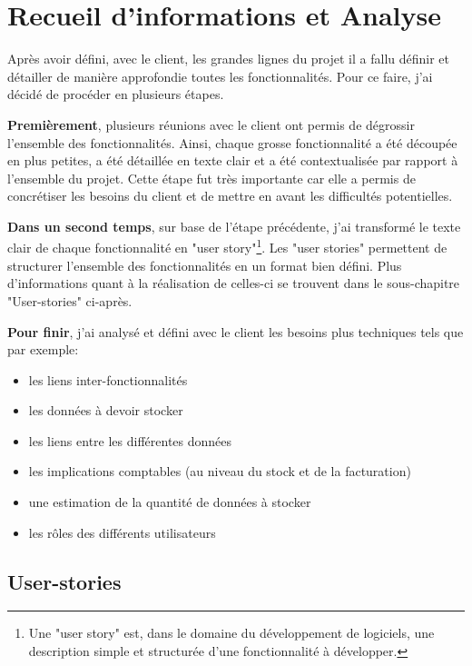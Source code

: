 \section{Recueil d'informations et Analyse}

Après avoir défini, avec le client, les grandes lignes du projet il a fallu définir et détailler de manière approfondie toutes les fonctionnalités. Pour ce faire, j'ai décidé de procéder en plusieurs étapes. 

\newpara

\textbf{Premièrement}, plusieurs réunions avec le client ont permis de dégrossir l'ensemble des fonctionnalités. Ainsi, chaque grosse fonctionnalité a été découpée en plus petites, a été détaillée en texte clair et a été contextualisée par rapport à l'ensemble du projet. 
Cette étape fut très importante car elle a permis de concrétiser les besoins du client et de mettre en avant les difficultés potentielles. 

\newpara

\textbf{Dans un second temps}, sur base de l'étape précédente, j'ai transformé le texte clair de chaque fonctionnalité en "user story"\footnote{Une "user story" est, dans le domaine du développement de logiciels, une description simple et structurée d'une fonctionnalité à développer.}. Les "user stories" permettent de structurer l'ensemble des fonctionnalités en un format bien défini. Plus d'informations quant à la réalisation de celles-ci se trouvent dans le sous-chapitre "User-stories" ci-après. 

\newpara

\textbf{Pour finir}, j'ai analysé et défini avec le client les besoins plus techniques tels que par exemple: 
\begin{itemize}
  \item les liens inter-fonctionnalités
  \item les données à devoir stocker 
  \item les liens entre les différentes données
  \item les implications comptables (au niveau du stock et de la facturation)
  \item une estimation de la quantité de données à stocker
  \item les rôles des différents utilisateurs
\end{itemize}

\newpage

\subsection{User-stories}

